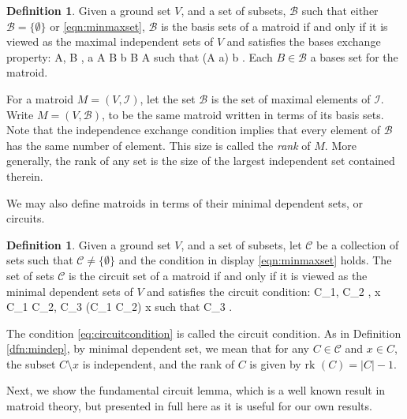 \documentclass[11pt]{article}
\newcommand{\rk}{\textrm{rk }}
\def\ba #1\ea{\begin{align} #1 \end{align}}
\newcommand{\sI}{\mathscr{I}}
\newcommand{\sC}{\mathscr{C}}
\newcommand{\cC}{\mathcal{C}}
\newcommand{\sB}{\mathscr{B}}
\theoremstyle{remark}
\theoremstyle{definition}
\newtheorem{dfn}[thm]{Definition}
\begin{document}
\begin{dfn} \label{dfn:matroidbasis}
Given a ground set $V$, and a set of subsets, $\sB$ such that either $\sB = \{\emptyset\}$ or \eqref{eqn:minmaxset}, $\sB$ is the basis sets of a matroid if and only if it is viewed as the maximal independent sets of $V$ and satisfies the bases exchange property:
\ba \forall \; A, B \in \sB, \; a \in A \setminus B\; \exists b \in B \setminus A \textrm{ such that } (A \setminus a) \cup b \in \sB\;. \label{eq:basisexchange}\ea Each $B \in \sB$ a bases set for the matroid.
\end{dfn}

For a matroid $M = (V, \sI)$, let the set $\sB$ is the set of maximal elements of $\sI$. Write $M= (V, \sB)$, to be the same matroid written in terms of its basis sets. Note that the independence exchange condition implies that every element of $\sB$ has the same number of element. This size is called the \emph{rank} of $M$. More generally, the rank of any set is the size of the largest independent set contained therein.

We may also define matroids in terms of their minimal dependent sets, or circuits.

\begin{dfn} \label{dfn:matroidcircuit}
Given a ground set $V$, and a set of subsets, let $\sC$ be a collection of sets such that  $\sC \neq \{\emptyset\}$ and the condition in display \eqref{eqn:minmaxset} holds. The set of sets $\sC$ is the circuit set of a matroid if and only if it is viewed as the minimal dependent sets of $V$ and  satisfies the circuit condition:
	\ba \forall C_1, C_2 \in \cC, x \in C_1 \cap C_2, \; \exists C_3 \subseteq (C_1 \cup C_2) \setminus x\; \textrm{such that }C_3 \in \cC \;. \label{eq:circuitcondition}\ea 
\end{dfn}

The condition \eqref{eq:circuitcondition} is called the circuit condition. As in Definition \ref{dfn:mindep}, by minimal dependent set, we mean that for any $C \in \cC$ and $x \in C$, the subset $C \setminus x$ is independent, and the rank of $C$ is given by $\rk (C)  = |C|-1$. 

Next, we show the fundamental circuit lemma, which is a well known result in matroid theory, but presented in full here as it is useful for our own results. 
\end{document}
